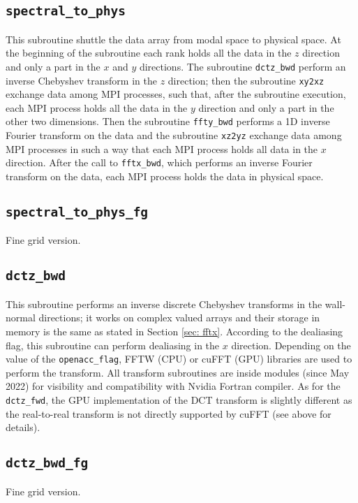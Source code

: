 \subsection{\texttt{spectral\_to\_phys}}
This subroutine shuttle the data array from modal space to physical space. At the beginning of the subroutine each rank holds all the data in the $z$ direction and only a part in the $x$ and $y$ directions. The subroutine \texttt{dctz\_bwd} perform an inverse Chebyshev transform in the $z$ direction; then the subroutine \texttt{xy2xz} exchange data among MPI processes, such that, after the subroutine execution, each MPI process holds all the data in the $y$ direction and only a part in the other two dimensions. 
Then the subroutine \texttt{ffty\_bwd} performs a 1D inverse Fourier transform on the data and the subroutine \texttt{xz2yz} exchange data among MPI processes in such a way that each MPI process holds all data in the $x$ direction. After the call to \texttt{fftx\_bwd}, which performs an inverse Fourier transform on the data, each MPI process holds the data in physical space.

\subsection{\texttt{spectral\_to\_phys\_fg}}
Fine grid version.

\subsection{\texttt{dctz\_bwd}}
This subroutine performs an inverse discrete Chebyshev transforms in the wall-normal directions; it works on complex valued arrays and their storage in memory is the same as stated in Section \ref{sec: fftx}. According to the dealiasing flag, this subroutine can perform dealiasing in the $x$ direction.
Depending on the value of the \texttt{openacc\_flag}, FFTW (CPU) or cuFFT (GPU) libraries are used to perform the transform.
All transform subroutines are inside modules (since May 2022) for visibility and compatibility with Nvidia Fortran compiler.
As for the \texttt{dctz\_fwd}, the GPU implementation of the DCT transform is slightly different as the real-to-real transform is not directly supported by cuFFT (see above for details).

\subsection{\texttt{dctz\_bwd\_fg}}
Fine grid version.


